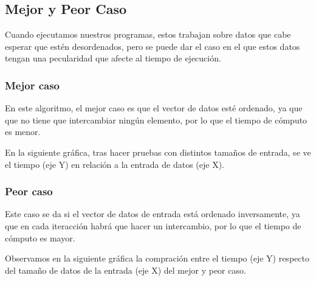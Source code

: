 \subsection{Mejor y Peor Caso}

Cuando ejecutamos nuestros programas, estos trabajan sobre datos que cabe esperar que estén desordenados, pero se puede dar el caso en el que estos datos tengan una pecularidad que afecte al tiempo de ejecución.

\subsubsection{Mejor caso}

En este algoritmo, el mejor caso es que el vector de datos esté ordenado, ya que que no tiene que intercambiar ningún elemento, por lo que el tiempo de cómputo es menor.

En la siguiente gráfica, tras hacer pruebas con distintos tamaños de entrada, se ve el tiempo (eje Y) en relación a la entrada de datos (eje X).


\subsubsection{Peor caso}

Este caso se da si el vector de datos de entrada está ordenado inversamente, ya que en cada iteracción habrá que hacer un intercambio, por lo que el tiempo de cómputo es mayor.

Observamos en la siguiente gráfica la compración entre el tiempo (eje Y) respecto del tamaño de datos de la entrada (eje X) del mejor y peor caso.

